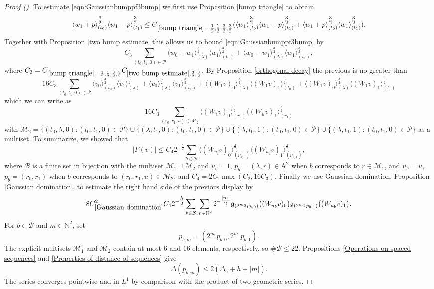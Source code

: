 \documentclass[12pt,reqno]{amsart}
\newcommand{\auto}{{({\tiny\faCar})}}
\theoremstyle{plain}
\numberwithin{equation}{section}
\theoremstyle{remark}
\newcommand{\N}{{\mathbb N}}
\begin{document}
\begin{proof}[Proof \auto]
To estimate \eqref{eqn:Gaussianbumppf3bump} we first use Proposition \ref{bump triangle} to obtain
\[ \langle w_1+p\rangle_{(t_0)}^{\tfrac32} \langle w_1-p\rangle_{(t_1)}^{\tfrac32}
\leq C_{\ref{bump triangle},-\tfrac12,\tfrac12,\tfrac32,\tfrac32}(\langle w_1\rangle_{(t_0)}^{\tfrac32} \langle w_1-p\rangle_{(t_1)}^{\tfrac32} + \langle w_1+p\rangle_{(t_0)}^{\tfrac32} \langle w_1\rangle_{(t_1)}^{\tfrac32}). \]
Together with Proposition \ref{two bump estimate} this allows us to bound \eqref{eqn:Gaussianbumppf3bump} by
\[ C_3 \sum_{(t_0,t_1,0)\in\mathcal{P}} \langle w_0+w_1\rangle_{(\lambda)}^{\tfrac32} \langle w_1\rangle_{(t_0)}^{\tfrac32} + \langle w_0-w_1\rangle_{(\lambda)}^{\tfrac32} \langle w_1\rangle_{(t_1)}^{\tfrac32},   \]
where $C_3=C_{\ref{bump triangle},-\frac12,\frac12,\frac32,\frac32} C_{\ref{two bump estimate},\frac32,\frac32}$.
By Proposition \ref{orthogonal decay} the previous is no greater than
\[
16C_3\sum_{(t_0,t_1,0)\in\mathcal P}
\langle v_0\rangle_{(t_0)}^{\tfrac32}
\langle v_1\rangle_{(\lambda)}^{\tfrac32} +
\langle v_0\rangle_{(\lambda)}^{\tfrac32}
\langle v_1\rangle_{(t_1)}^{\tfrac32} +
\langle (W_1v)_0\rangle_{(\lambda)}^{\tfrac32}
\langle (W_1v)_1\rangle_{(t_0)}^{\tfrac32}+
\langle (W_1v)_0\rangle_{(\lambda)}^{\tfrac32}
\langle (W_1v)_1\rangle_{(t_1)}^{\tfrac32}
\]
which we can write as
\[ 16C_3 \sum_{(r_0,r_1,u)\in\mathcal{M}_2}\langle (W_u v)_0\rangle_{(r_0)}^{\tfrac32}
\langle (W_u v)_1\rangle_{(r_1)}^{\tfrac32} \]
with $\mathcal{M}_2
=
\{(t_0,\lambda,0):(t_0,t_1,0)\in\mathcal{P}\}
\cup
\{(\lambda,t_1,0):(t_0,t_1,0)\in\mathcal{P}\}
\cup
\{(\lambda,t_0,1):(t_0,t_1,0)\in\mathcal{P}\}
\cup
\{(\lambda,t_1,1):(t_0,t_1,0)\in\mathcal{P}\}$ as a multiset.
To summarize, we showed that
\[ |F(v)|\le C_4 2^{-\tfrac h2} \sum_{b\in\mathcal{B}}\langle (W_{u_b} v)_0\rangle_{(p_{b,0})}^{\tfrac32}
\langle (W_{u_b} v)_1\rangle_{(p_{b,1})}^{\tfrac32},  \]
where $\mathcal{B}$ is a finite set in bijection with the multiset $\mathcal{M}_1\sqcup \mathcal{M}_2$ and $u_b=1$, $p_{b}=(\lambda, r)\in\mathrm{A}^2$ when $b$ corresponds to $r\in \mathcal{M}_1$, and $u_b=u$, $p_b=(r_0,r_1)$ when $b$ corresponds to $(r_0,r_1,u)\in\mathcal{M}_2$, and
$C_4 = 2C_1 \max(C_2,16C_3).$
Finally we use Gaussian domination, Proposition \ref{Gaussian domination}, to estimate the right hand side of the previous display by
\[ 8 C_{\ref{Gaussian domination}}^2 C_4  2^{-\tfrac h2}
\sum_{b\in\mathcal B}
\sum_{m\in\mathbb{N}^2}
2^{-\tfrac{|m|}{2}}
\mathfrak{g}_{(2^{m_0}p_{b,0})}\big((W_{u_b}v)_0\big)
\mathfrak{g}_{(2^{m_1}p_{b,1})}\big((W_{u_b}v)_1\big). \]
For $b\in\mathcal B$ and $m\in\N^2$, set
\[
p_{b,m}=(2^{m_0}p_{b,0},2^{m_1}p_{b,1}).
\]
The explicit multisets $\mathcal M_1$ and $\mathcal M_2$ contain at most $6$ and $16$ elements, respectively, so $\#\mathcal B\le22$. Propositions \ref{Operations on spaced sequences} and \ref{Properties of distance of sequences} give
\[
\Delta(p_{b,m})\le2(\Delta_\gamma+h+|m|).
\]
The series converges pointwise and in $L^1$ by comparison with the product of two geometric series.

\medskip
\end{proof}
\end{document}
